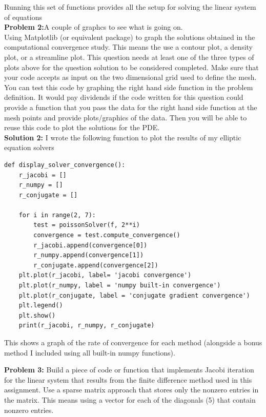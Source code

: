 \documentclass[10pt]{article}
\newcommand{\1}{\mathbb{1}}
\begin{document}
Running this set of functions provides all the setup for solving the linear system of equations\\

\textbf{Problem 2:}A couple of graphcs to see what is going on.\\

Using Matplotlib (or equivalent package) to graph the solutions obtained in the computational convergence study. This means the use a contour plot, a density plot, or a streamline plot. This question needs at least one of the three types of plots above for the question solution to be considered completed. Make sure that your code accepts as input on the two dimensional grid used to define the mesh. You can test this code by graphing the right hand side function in the problem definition. It would pay dividends if the code written for this question could provide a function that you pass the data for the right hand side function at the mesh points and provide plots/graphics of the data. Then you will be able to reuse this code to plot the solutions for the PDE.\\

\textbf{Solution 2:} I wrote the following function to plot the results of my elliptic equation solvers

\begin{verbatim}
def display_solver_convergence():
    r_jacobi = []
    r_numpy = []
    r_conjugate = []

    for i in range(2, 7):
        test = poissonSolver(f, 2**i)
        convergence = test.compute_convergence()
        r_jacobi.append(convergence[0])
        r_numpy.append(convergence[1])
        r_conjugate.append(convergence[2])
    plt.plot(r_jacobi, label= 'jacobi convergence')
    plt.plot(r_numpy, label = 'numpy built-in convergence')
    plt.plot(r_conjugate, label = 'conjugate gradient convergence')
    plt.legend()
    plt.show()
    print(r_jacobi, r_numpy, r_conjugate)
\end{verbatim}

This shows a graph of the rate of convergence for each method (alongside a bonus method I included using all built-in numpy functions).

\textbf{Problem 3:} Build a piece of code or function that implements Jacobi iteration for the linear system that results from the finite difference method used in this assignment. Use a sparse matrix approach that stores only the nonzero entries in the matrix. This means using a vector for each of the diagonals (5) that contain nonzero entries.\\
\end{document}
